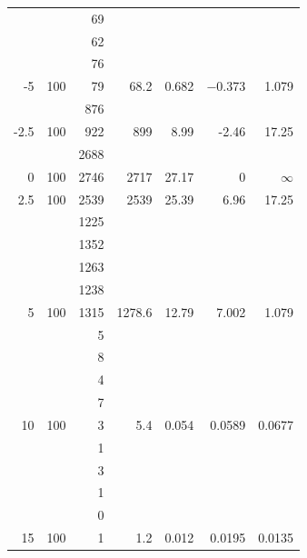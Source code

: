 \documentclass[a4paper]{article}
\begin{document}
\begin{figure}[H]
\begin{center}
\begin{adjustwidth}{-3.75cm}{}
\begin{tabular}{|r|r|r|r|r|r|r|}
                             & & 69 & & & & \\
                             & & 62 & & & & \\
                             & & 76 & & & & \\
        -5 & 100 & 79 & 68.2 & \num{0.682} & \num{-0.373} & \num{1.079} \\
        \hline
                             & & 876 & & & & \\
        -2.5 & 100 & 922 & 899 & 8.99 & -2.46 & 17.25 \\
        \hline
                             & & 2688 & & & & \\
        0 & 100 & 2746 & 2717 & 27.17 & 0 & \( \infty \) \\
      \hline
        2.5 & 100 & 2539 & 2539 & 25.39 & 6.96 & 17.25 \\
        \hline
                             & & 1225 & & & & \\
                             & & 1352 & & & & \\
                             & & 1263 & & & & \\
                             & & 1238 & & & & \\
        5 & 100 & 1315 & 1278.6 & 12.79 & 7.002 & 1.079 \\
        \hline
                             & & 5 & & & & \\
                             & & 8 & & & & \\
                             & & 4 & & & & \\
                             & & 7 & & & & \\
        10 & 100 & 3 & 5.4 & \num{0.054} & \num{0.0589} & \num{0.0677} \\
        \hline
                             & & 1 & & & & \\
                             & & 3 & & & & \\
                             & & 1 & & & & \\
                             & & 0 & & & & \\
        15 & 100 & 1 & 1.2 & \num{0.012} & \num{0.0195} & \num{0.0135} \\
        \hline
      \end{tabular}
    \end{adjustwidth}
  \end{center}
  \label{tab:scatRatesGold}
\end{figure}
\end{document}
